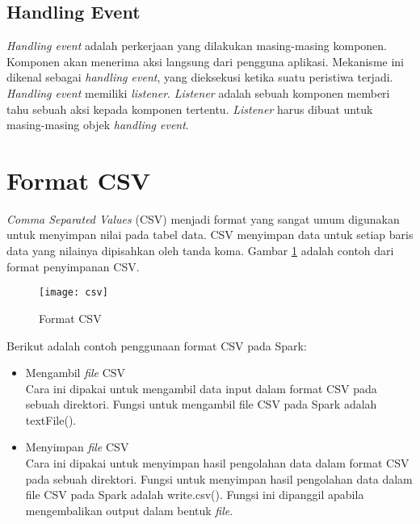 \subsection{Handling Event}
\textit{Handling event} adalah perkerjaan yang dilakukan masing-masing komponen. Komponen akan menerima aksi langsung dari pengguna aplikasi. Mekanisme ini dikenal sebagai \textit{handling event}, yang dieksekusi ketika suatu peristiwa terjadi. \textit{Handling event} memiliki \textit{listener}. \textit{Listener} adalah sebuah komponen memberi tahu sebuah aksi kepada komponen tertentu. \textit{Listener} harus dibuat untuk masing-masing objek \textit{handling event}. 

\section{Format CSV}
\label{theory:csv}
\textit{Comma Separated Values} (CSV) menjadi format yang sangat umum digunakan untuk menyimpan nilai pada tabel data. CSV menyimpan data untuk setiap baris data yang nilainya dipisahkan oleh tanda koma. Gambar \ref{fig:csv} adalah contoh dari format penyimpanan CSV.
  
\begin{figure}[H]
	\centering
	\texttt{[image: csv]}
	\caption{Format CSV}
	\label{fig:csv}
\end{figure}

\noindent Berikut adalah contoh penggunaan format CSV pada Spark:

\begin{itemize}

\item Mengambil \textit{file} CSV \\
Cara ini dipakai untuk mengambil data input dalam format CSV pada sebuah direktori. Fungsi untuk mengambil file CSV pada Spark adalah \textsf{textFile()}. 

\item Menyimpan \textit{file} CSV \\
Cara ini dipakai untuk menyimpan hasil pengolahan data dalam format CSV pada sebuah direktori. Fungsi untuk menyimpan hasil pengolahan data dalam file CSV pada Spark adalah \textsf{write.csv()}. Fungsi ini dipanggil apabila mengembalikan output dalam bentuk \textit{file}.

\end{itemize}


